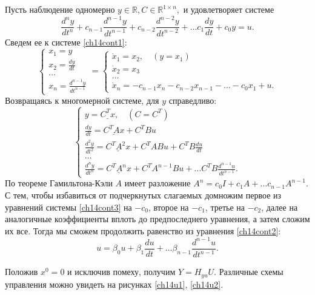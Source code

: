 Пусть наблюдение одномерно $y \in \ensuremath{\mathbb{R}}, C \in \ensuremath{\mathbb{R}}^{1 \times n},$ и удовлетворяет системе
\begin{equation}\label{ch14cont2}
\frac{d^ny}{dt^n} + c_{n-1}\frac{d^{n-1}y}{dt^{n-1}} + c_{n-2}\frac{d^{n-2}y}{dt^{n-2}} + \ldots c_1 \frac{dy}{dt} + c_0 y = u.
\end{equation}
Сведем ее к системе \eqref{ch14cont1}:
\begin{equation}
\begin{cases}
x_1 = y \\
x_2 = \frac{dy}{dt} \\
\ldots \\
x_n = \frac{d^{n-1}y}{dt^{n-1}} 
\end{cases} = 
\begin{cases}
\dot x_1 = x_2, \quad (y = x_1) \\
\dot x_2 = x_3 \\
\ldots \\
\dot x_n = -c_{n-1} x_{n}- c_{n-2} x_{n-1}- \ldots -c_0 x_1 + u.
\end{cases}
\end{equation}
Возвращаясь к многомерной системе, для $y$ справедливо:
\begin{equation}\label{ch14cont3}
\begin{cases}
y = \underline{C^T x}, \quad (C = C^T) \\
\frac{dy}{dt} = \underline{C^T A x} + C^T Bu \\
\frac{d^2y}{dt^2} = \underline{C^T A ^2x} + C^T A B u + C^T B \frac{du}{dt} \\
\ldots \\
\frac{d^ny}{dt^n} = \underline{C^T A ^n x} + C^T A^{n-1} B u +\ldots C^T B \frac{d^{n-1}u}{dt^{n-1}}.
\end{cases}
\end{equation}
По теореме Гамильтона-Кэли $A$ имеет разложение $A^n = c_0 I + c_1 A + \ldots c_{n-1} A^{n-1}.$  С тем, чтобы избавиться от подчеркнутых слагаемых домножим первое из уравнений системы \eqref{ch14cont3} на $-c_0$, второе на $-c_1$, третье на $-c_2$, далее на аналогичные коэффициенты вплоть до предпоследнего уравнения, а затем сложим их все. Тогда мы сможем продолжить равенство из уравнения \eqref{ch14cont2}:
$$ u = \beta_0 u + \beta_1 \frac{du}{dt} + \ldots \beta_{n-1}\frac{d^{n-1}u}{dt^{n-1}}.$$

Положив $x^0 = 0$ и исключив помеху, получим $Y = H_{yu}U$. Различные схемы управления можно увидеть на рисунках \ref{ch14u1}, \ref{ch14u2}. 


